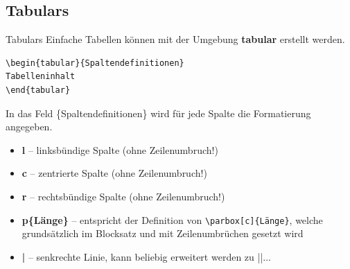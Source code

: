 \subsection{Tabulars}
\begin{frame}[fragile]{Tabulars}
Einfache Tabellen können mit der Umgebung \textbf{tabular} erstellt werden.
\begin{lstlisting}[style=tex]
\begin{tabular}{Spaltendefinitionen}
Tabelleninhalt
\end{tabular}
\end{lstlisting}

In das Feld \{Spaltendefinitionen\} wird für jede Spalte die Formatierung angegeben. \\

\begin{itemize}
	\item \textbf{l} -- linksbündige Spalte (ohne Zeilenumbruch!) 
	\item \textbf{c} -- zentrierte Spalte (ohne Zeilenumbruch!)
	\item \textbf{r} -- rechtsbündige Spalte (ohne Zeilenumbruch!)
	\item \textbf{p\{Länge\}} -- entspricht der Definition von \texttt{\textbackslash parbox[c]\{Länge\}}, welche grundsätzlich im Blocksatz und mit Zeilenumbrüchen gesetzt wird
	\item \textbf{|} -- senkrechte Linie, kann beliebig erweitert werden zu ||...
\end{itemize}
\end{frame}

